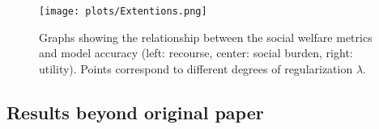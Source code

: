 \begin{figure}
    \centering
    \hspace*{-.5in}
    \texttt{[image: plots/Extentions.png]}
    \caption{Graphs showing the relationship between the social welfare metrics and model accuracy (left: recourse, center: social burden, right: utility). Points correspond 
    to different degrees of regularization $\lambda$. }
    \label{fig:extention_results}
\end{figure}


    
\subsection{Results beyond original paper}

